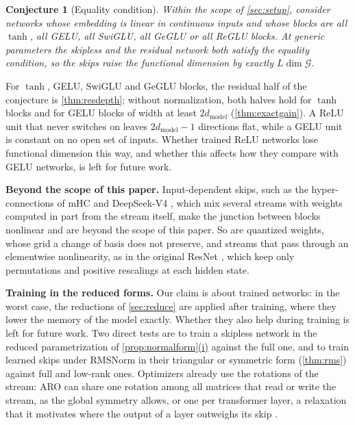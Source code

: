 \documentclass[10pt]{article}
\newtheorem{conjecture}{Conjecture}
\theoremstyle{definition}
\theoremstyle{remark}
\newcommand{\dm}{d_{\mathrm{model}}}
\newcommand{\G}{\mathcal{G}}
\newcommand{\para}[1]{\smallskip\noindent\textbf{#1}\hspace{0.5em}}
\DeclareRobustCommand{\cpref}[2]{\hyperref[#1:#2]{\cref*{#1}(#2)}}
\begin{document}
\begin{conjecture}[Equality condition]\label{conj:equality}
Within the scope of \cref{sec:setup}, consider networks whose embedding is linear in continuous inputs and whose blocks are all $\tanh$, all GELU, all SwiGLU, all GeGLU or all ReGLU blocks. At generic parameters the skipless and the residual network both satisfy the equality condition, so the skips raise the functional dimension by exactly $L\dim\G$.
\end{conjecture}

For $\tanh$, GELU, SwiGLU and GeGLU blocks, the residual half of the conjecture is \cref{thm:resdepth}; without normalization, both halves hold for $\tanh$ blocks and for GELU blocks of width at least $2\dm$ (\cref{thm:exactgain}). A ReLU unit that never switches on leaves $2\dm - 1$ directions flat, while a GELU unit is constant on no open set of inputs. Whether trained ReLU networks lose functional dimension this way, and whether this affects how they compare with GELU networks, is left for future work.

\para{Beyond the scope of this paper.} Input-dependent skips, such as the hyper-connections of mHC \citep{xie2025mhc} and DeepSeek-V4 \citep{deepseek2026v4}, which mix several streams with weights computed in part from the stream itself, make the junction between blocks nonlinear and are beyond the scope of this paper. So are quantized weights, whose grid a change of basis does not preserve, and streams that pass through an elementwise nonlinearity, as in the original ResNet \citep{he2016resnet}, which keep only permutations and positive rescalings at each hidden state.

\para{Training in the reduced forms.} Our claim is about trained networks: in the worst case, the reductions of \cref{sec:reduce} are applied after training, where they lower the memory of the model exactly. Whether they also help during training is left for future work. Two direct tests are to train a skipless network in the reduced parametrization of \cpref{prop:normalform}{i} against the full one, and to train learned skips under RMSNorm in their triangular or symmetric form (\cref{thm:rms}) against full and low-rank ones. Optimizers already use the rotations of the stream: ARO can share one rotation among all matrices that read or write the stream, as the global symmetry allows, or one per transformer layer, a relaxation that it motivates where the output of a layer outweighs its skip \citep[Sections~6.4 and~6.5]{gong2026aro}.
\end{document}
